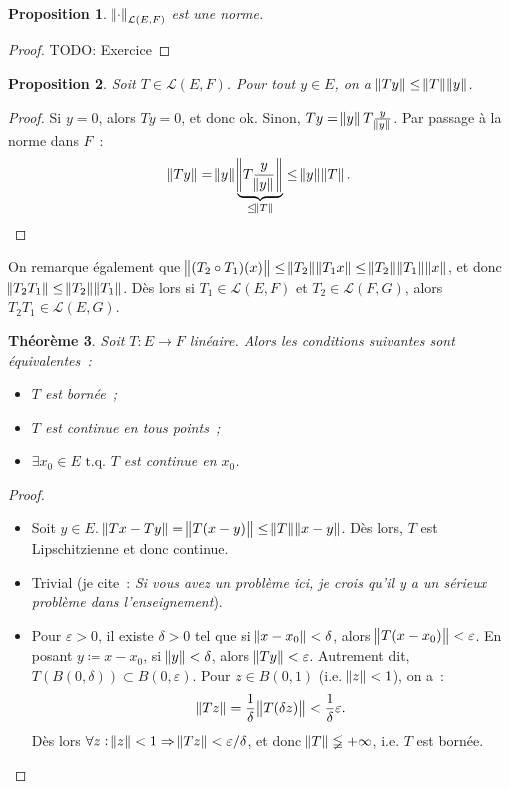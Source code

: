 \documentclass{report}
\newcommand{\tq}{\text{ t.q. }}
\newcommand{\st}{\tq}
\newcommand{\pinfty}{{+\infty}}
\newcommand{\TODO}{TODO}
\newtheorem{thm}{Théorème}[chapter]
\newtheorem{prp}[thm]{Proposition}
\theoremstyle{definition}
\theoremstyle{remark}
\begin{document}
\begin{prp} $\norm \cdot_{\mathcal L(E, F)}$ est une norme.
\end{prp}

\begin{proof} \TODO: Exercice
\end{proof}

\begin{prp} Soit $T \in \mathcal L(E, F)$. Pour tout $y \in E$, on a $\norm {Ty} \leq \norm T\norm y$.
\end{prp}

\begin{proof} Si $y = 0$, alors $Ty = 0$, et donc ok. Sinon, $Ty = \norm yT\frac y{\norm y}$. Par passage à la norme dans $F$~:
\[\norm {Ty} = \norm y \underbrace {\norm {T\frac y{\norm y}}}_{\leq \norm T} \leq \norm y\norm T.\]
\end{proof}

On remarque également que $\norm {(T_2 \circ T_1)(x)} \leq \norm {T_2}\norm {T_1x} \leq \norm {T_2}\norm {T_1}\norm x$, et donc $\norm {T_2T_1} \leq \norm {T_2}\norm {T_1}$. Dès lors
si $T_1 \in \mathcal L(E, F)$ et $T_2 \in \mathcal L(F, G)$, alors $T_2T_1 \in \mathcal L(E, G)$.

\begin{thm}\label{thm:opérateur continu ssi borné} Soit $T : E \to F$ linéaire. Alors les conditions suivantes sont équivalentes~:
\begin{itemize}
	\item[$(i)$]   $T$ est bornée~;
	\item[$(ii)$]  $T$ est continue en tous points~;
	\item[$(iii)$] $\exists x_0 \in E \st T$ est continue en $x_0$.
\end{itemize}
\end{thm}

\begin{proof}~
\begin{itemize}
	\item[$(i) \Rightarrow (ii)$]   Soit $y \in E$. $\norm {Tx - Ty} = \norm {T(x-y)} \leq \norm T\norm {x-y}$. Dès lors, $T$ est Lipschitzienne et donc continue.
	\item[$(ii) \Rightarrow (iii)$] Trivial (je cite~: \textit{Si vous avez un problème ici, je crois qu'il y a un sérieux problème dans l'enseignement}).
	\item[$(iii) \Rightarrow (i)$]  Pour $\varepsilon > 0$, il existe $\delta > 0$ tel que si $\norm {x-x_0} < \delta$, alors $\norm {T(x-x_0)} < \varepsilon$.
		En posant $y \coloneqq x-x_0$, si $\norm y < \delta$, alors $\norm {Ty} < \varepsilon$. Autrement dit, $T(B(0, \delta)) \subset B(0, \varepsilon)$.
		Pour $z \in B(0, 1)$ (i.e. $\norm z < 1$), on a~:
		\[\norm {Tz} = \frac 1\delta\norm {T(\delta z)} < \frac 1\delta \varepsilon.\]
		Dès lors $\forall z : \norm z < 1 \Rightarrow \norm {Tz} < \varepsilon/\delta$, et donc $\norm T \lneqq \pinfty$, i.e. $T$ est bornée.
\end{itemize}
\end{proof}
\end{document}
